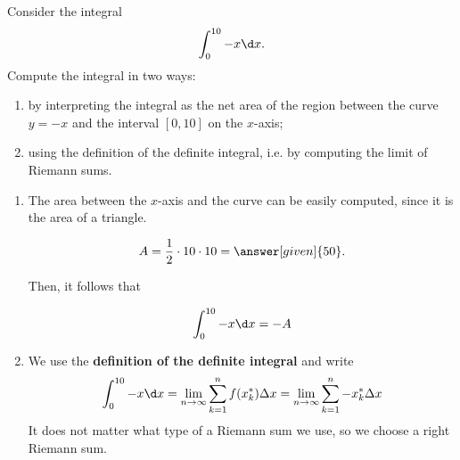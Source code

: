 \documentclass{ximera}
\begin{document}
\begin{example}
Consider the integral
\[
\int_0^{10}-x \d x.
\]
Compute the integral in two ways:
\begin{enumerate}
\item by interpreting the integral as the net area of the region between the curve $y=-x$ and the interval $[0,10]$ on  the $x$-axis;
\item using the definition of the definite integral, i.e. by computing the limit of Riemann sums.
\end{enumerate}
\begin{explanation}
\begin{enumerate}
\item The  area between the $x$-axis and the curve can be easily computed, since it is the area of a triangle.
\begin{image}
\end{image}

\[
A=\frac{1}{2}\cdot 10\cdot10=\answer[given]{50}.
\]

Then, it follows that

\[
\int_0^{10}-x \d x=-A
\]
\item We use the \textbf{definition of the definite integral} and write
\[
\int_0^{10}-x \d x=\lim_{n\to\infty}\sum_{k=1}^n f(x_k^*)\Delta x=\lim_{n\to\infty}\sum_{k=1}^n -x_k^*\Delta x
\]
It does not matter what  type of a Riemann sum we use, so we choose a right Riemann sum.


\end{enumerate}
\end{explanation}
\end{example}
\end{document}
